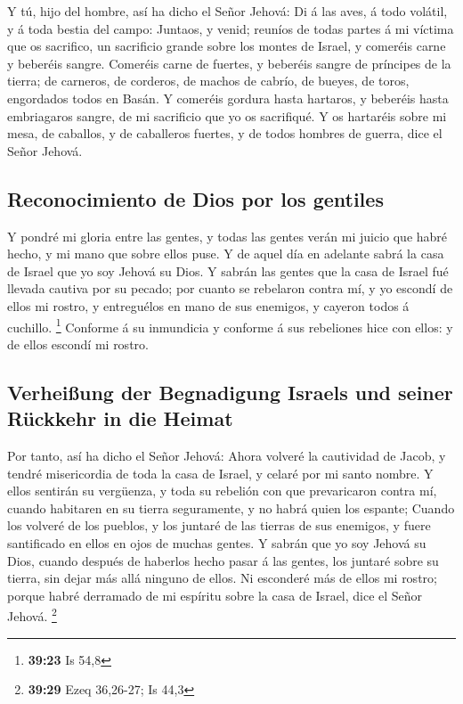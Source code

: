  Y tú, hijo del hombre, así ha dicho el Señor Jehová: Di á
las aves, á todo volátil, y á toda bestia del campo: Juntaos, y venid;
reuníos de todas partes á mi víctima que os sacrifico, un sacrificio
grande sobre los montes de Israel, y comeréis carne y beberéis sangre.
 Comeréis carne de fuertes, y beberéis sangre de príncipes
de la tierra; de carneros, de corderos, de machos de cabrío, de bueyes,
de toros, engordados todos en Basán.  Y comeréis gordura
hasta hartaros, y beberéis hasta embriagaros sangre, de mi sacrificio
que yo os sacrifiqué.  Y os hartaréis sobre mi mesa, de
caballos, y de caballeros fuertes, y de todos hombres de guerra, dice el
Señor Jehová.

\hypertarget{reconocimiento-de-dios-por-los-gentiles}{%
\subsection{Reconocimiento de Dios por los
gentiles}\label{reconocimiento-de-dios-por-los-gentiles}}

 Y pondré mi gloria entre las gentes, y todas las gentes
verán mi juicio que habré hecho, y mi mano que sobre ellos puse.
 Y de aquel día en adelante sabrá la casa de Israel que yo
soy Jehová su Dios.  Y sabrán las gentes que la casa de
Israel fué llevada cautiva por su pecado; por cuanto se rebelaron contra
mí, y yo escondí de ellos mi rostro, y entreguélos en mano de sus
enemigos, y cayeron todos á cuchillo. \footnote{\textbf{39:23} Is 54,8}
 Conforme á su inmundicia y conforme á sus rebeliones hice
con ellos: y de ellos escondí mi rostro.

\hypertarget{verheiuxdfung-der-begnadigung-israels-und-seiner-ruxfcckkehr-in-die-heimat}{%
\subsection{Verheißung der Begnadigung Israels und seiner Rückkehr in
die
Heimat}\label{verheiuxdfung-der-begnadigung-israels-und-seiner-ruxfcckkehr-in-die-heimat}}

 Por tanto, así ha dicho el Señor Jehová: Ahora volveré la
cautividad de Jacob, y tendré misericordia de toda la casa de Israel, y
celaré por mi santo nombre.  Y ellos sentirán su vergüenza,
y toda su rebelión con que prevaricaron contra mí, cuando habitaren en
su tierra seguramente, y no habrá quien los espante; 
Cuando los volveré de los pueblos, y los juntaré de las tierras de sus
enemigos, y fuere santificado en ellos en ojos de muchas gentes.
 Y sabrán que yo soy Jehová su Dios, cuando después de
haberlos hecho pasar á las gentes, los juntaré sobre su tierra, sin
dejar más allá ninguno de ellos.  Ni esconderé más de ellos
mi rostro; porque habré derramado de mi espíritu sobre la casa de
Israel, dice el Señor Jehová. \footnote{\textbf{39:29} Ezeq 36,26-27; Is
  44,3}

